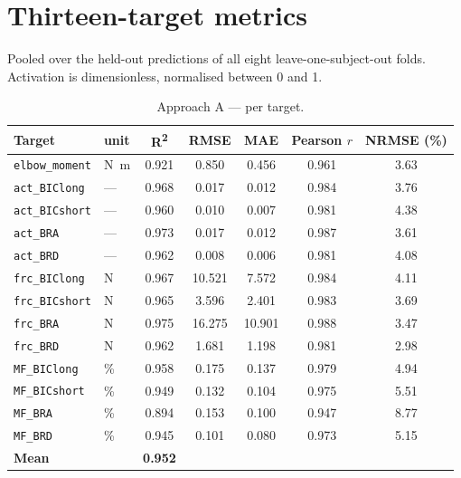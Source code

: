 \section{Thirteen-target metrics}

Pooled over the held-out predictions of all eight leave-one-subject-out folds.
Activation is dimensionless, normalised between 0 and 1.

\begin{table}[H]
\centering
\caption{Approach A --- per target.}
\label{tab:app:Afull}
\small
\begin{tabular}{@{}llccccc@{}}
\toprule
\textbf{Target} & \textbf{unit} & \textbf{R\textsuperscript{2}} & \textbf{RMSE} &
\textbf{MAE} & \textbf{Pearson $r$} & \textbf{NRMSE (\%)} \\
\midrule
\texttt{elbow\_moment} & \si{\newton\metre} & 0.921 & 0.850 & 0.456 & 0.961 & 3.63 \\
\addlinespace
\texttt{act\_BIClong}  & --- & 0.968 & 0.017 & 0.012 & 0.984 & 3.76 \\
\texttt{act\_BICshort} & --- & 0.960 & 0.010 & 0.007 & 0.981 & 4.38 \\
\texttt{act\_BRA}      & --- & 0.973 & 0.017 & 0.012 & 0.987 & 3.61 \\
\texttt{act\_BRD}      & --- & 0.962 & 0.008 & 0.006 & 0.981 & 4.08 \\
\addlinespace
\texttt{frc\_BIClong}  & \si{\newton} & 0.967 & 10.521 & 7.572 & 0.984 & 4.11 \\
\texttt{frc\_BICshort} & \si{\newton} & 0.965 &  3.596 & 2.401 & 0.983 & 3.69 \\
\texttt{frc\_BRA}      & \si{\newton} & 0.975 & 16.275 & 10.901 & 0.988 & 3.47 \\
\texttt{frc\_BRD}      & \si{\newton} & 0.962 &  1.681 & 1.198 & 0.981 & 2.98 \\
\addlinespace
\texttt{MF\_BIClong}   & \si{\percent} & 0.958 & 0.175 & 0.137 & 0.979 & 4.94 \\
\texttt{MF\_BICshort}  & \si{\percent} & 0.949 & 0.132 & 0.104 & 0.975 & 5.51 \\
\texttt{MF\_BRA}       & \si{\percent} & 0.894 & 0.153 & 0.100 & 0.947 & 8.77 \\
\texttt{MF\_BRD}       & \si{\percent} & 0.945 & 0.101 & 0.080 & 0.973 & 5.15 \\
\midrule
\textbf{Mean} & & \textbf{0.952} & & & & \\
\bottomrule
\end{tabular}
\end{table}


